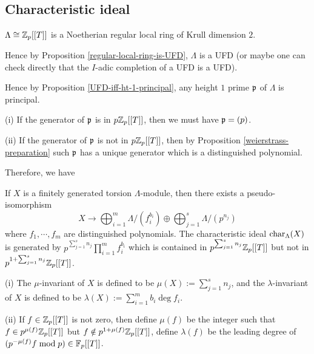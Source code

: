 \subsection{Characteristic ideal}

\begin{prop}
\label{Lambda-is-reg-of-dim-2}
$\Lambda\cong{\mathbb {Z}}_p[[T]]$ is a
Noetherian regular local ring of Krull dimension $2$.
\end{prop}

\begin{cor}
\label{Lambda-is-UFD}
Hence by Proposition \ref{regular-local-ring-is-UFD}, $\Lambda$ is a UFD
(or maybe one can check directly that the $I$-adic completion of a UFD is a UFD).
\end{cor}

\begin{cor}
\label{Lambda-ht-1-principal}
Hence by Proposition \ref{UFD-iff-ht-1-principal}, any height $1$ prime ${\mathfrak{p}}$ of $\Lambda$
is principal.

{\rm(i)}
If the generator of ${\mathfrak{p}}$ is in $p{\mathbb {Z}}_p[[T]]$, then
we must have ${\mathfrak{p}}=(p)$.

{\rm(ii)}
If the generator of ${\mathfrak{p}}$ is not in $p{\mathbb {Z}}_p[[T]]$, then
by Proposition \ref{weierstrass-preparation} such ${\mathfrak{p}}$
has a unique generator which is a distinguished polynomial.
\end{cor}

Therefore, we have

\begin{prop}
\label{Lambda-module-structure}
If $X$ is a finitely generated torsion $\Lambda$-module,
then there exists a pseudo-isomorphism
$$
X\to\bigoplus_{i=1}^m\Lambda/(f_i^{b_i})\oplus\bigoplus_{j=1}^s\Lambda/(p^{n_j})
$$
where $f_1,\cdots,f_m$ are distinguished polynomials.
The characteristic ideal $\operatorname{char}_\Lambda(X)$ is generated by
$p^{\sum_{j=1}^sn_j}\prod_{i=1}^mf_i^{b_i}$
which is contained in $p^{\sum_{j=1}^sn_j}{\mathbb {Z}}_p[[T]]$
but not in $p^{1+\sum_{j=1}^sn_j}{\mathbb {Z}}_p[[T]]$.
\end{prop}

\begin{definition}
\label{iwasawa-mod-invariants}
{\rm(i)}
The $\mu$-invariant of $X$
is defined to be $\mu(X):=\sum_{j=1}^sn_j$,
and the $\lambda$-invariant of $X$
is defined to be $\lambda(X):=\sum_{i=1}^mb_i\deg f_i$.

{\rm(ii)}
If $f\in{\mathbb {Z}}_p[[T]]$ is not zero, then define
$\mu(f)$ be the integer such that
$f\in p^{\mu(f)}{\mathbb {Z}}_p[[T]]$ but
$f\notin p^{1+\mu(f)}{\mathbb {Z}}_p[[T]]$,
define $\lambda(f)$ be the leading degree of
$(p^{-\mu(f)}f\bmod p)\in{\mathbb {F}}_p[[T]]$.
\end{definition}

